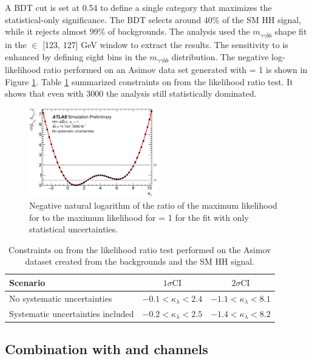 A BDT cut is set at 0.54 to define a single category that maximizes the statistical-only significance. The BDT selects around 40\% of the SM HH signal, while it rejects almost 99\% of backgrounds. The analysis used the $m_{\gamma\gamma\bar{b}b}$ shape fit in the \myy $\in$ [123, 127] GeV window to extract the results. The sensitivity to \kl is enhanced by defining eight bins in the $m_{\gamma\gamma\bar{b}b}$ distribution. The negative log-likelihood ratio performed on an Asimov data set generated with \kl = 1 is shown in Figure \ref{fig:HL-LHC:36ifb:LH}. Table \ref{tab:HL-LHC:36ifb:kl} summarized constraints on \kl from the likelihood ratio test. It shows that even with 3000 \ifb the analysis still statistically dominated.
\begin{figure}[htbp]
    \centering
    \includegraphics[width=0.5\textwidth]{Ch6/Img/figures_bbyy_NoSyst_likelihoodCurve_-3to10.eps}
    \caption{Negative natural logarithm of the ratio of the maximum likelihood for \kl to the maximum likelihood for \kl = 1 for the fit with only statistical uncertainties.}
    \label{fig:HL-LHC:36ifb:LH}
\end{figure}

\begin{table}[htbp]
    \centering
    \begin{tabular}{lcc}
\hline \hline Scenario & $1 \sigma \mathrm{CI}$ & $2 \sigma \mathrm{CI}$ \\
\hline No systematic uncertainties & $-0.1<\kappa_{\lambda}<2.4$ & $-1.1<\kappa_{\lambda}<8.1$ \\
Systematic uncertainties included & $-0.2<\kappa_{\lambda}<2.5$ & $-1.4<\kappa_{\lambda}<8.2$ \\
\hline \hline
\end{tabular}
    \caption{Constraints on \kl from the likelihood ratio test performed on the Asimov dataset created from the backgrounds and the SM HH signal.}
    \label{tab:HL-LHC:36ifb:kl}
\end{table}

\subsection{Combination with \bbbb and \bbtt channels}

